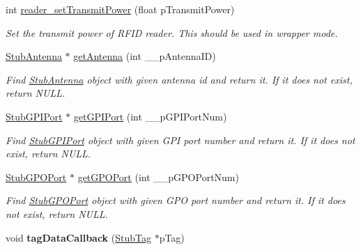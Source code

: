 \begin{DoxyCompactItemize}
int \hyperlink{class_e_l_f_i_n_1_1_stub_reader_a5a9a0ba4e3e351e7cbf7a83baf774ea5}{reader\-\_\-set\-Transmit\-Power} (float p\-Transmit\-Power)
\begin{DoxyCompactList}\small\item\em Set the transmit power of R\-F\-I\-D reader. This should be used in wrapper mode. \end{DoxyCompactList}\item 
\hyperlink{class_e_l_f_i_n_1_1_stub_antenna}{Stub\-Antenna} $\ast$ \hyperlink{class_e_l_f_i_n_1_1_stub_reader_a0f993c10f261ae61f809079f528532f9}{get\-Antenna} (int \-\_\-\-\_\-p\-Antenna\-I\-D)
\begin{DoxyCompactList}\small\item\em Find \hyperlink{class_e_l_f_i_n_1_1_stub_antenna}{Stub\-Antenna} object with given antenna id and return it. If it does not exist, return N\-U\-L\-L. \end{DoxyCompactList}\item 
\hyperlink{class_e_l_f_i_n_1_1_stub_g_p_i_port}{Stub\-G\-P\-I\-Port} $\ast$ \hyperlink{class_e_l_f_i_n_1_1_stub_reader_ae72055f44bcecdaa54862dad3599ee89}{get\-G\-P\-I\-Port} (int \-\_\-\-\_\-p\-G\-P\-I\-Port\-Num)
\begin{DoxyCompactList}\small\item\em Find \hyperlink{class_e_l_f_i_n_1_1_stub_g_p_i_port}{Stub\-G\-P\-I\-Port} object with given G\-P\-I port number and return it. If it does not exist, return N\-U\-L\-L. \end{DoxyCompactList}\item 
\hyperlink{class_e_l_f_i_n_1_1_stub_g_p_o_port}{Stub\-G\-P\-O\-Port} $\ast$ \hyperlink{class_e_l_f_i_n_1_1_stub_reader_ac952c20d5247d1bb7d28b9b73bed0c40}{get\-G\-P\-O\-Port} (int \-\_\-\-\_\-p\-G\-P\-O\-Port\-Num)
\begin{DoxyCompactList}\small\item\em Find \hyperlink{class_e_l_f_i_n_1_1_stub_g_p_o_port}{Stub\-G\-P\-O\-Port} object with given G\-P\-O port number and return it. If it does not exist, return N\-U\-L\-L. \end{DoxyCompactList}\item 
\hypertarget{class_e_l_f_i_n_1_1_stub_reader_af3f8a80801464546ed08640145b3d743}{void {\bfseries tag\-Data\-Callback} (\hyperlink{class_e_l_f_i_n_1_1_stub_tag}{Stub\-Tag} $\ast$p\-Tag)}\label{class_e_l_f_i_n_1_1_stub_reader_af3f8a80801464546ed08640145b3d743}

\end{DoxyCompactItemize}
